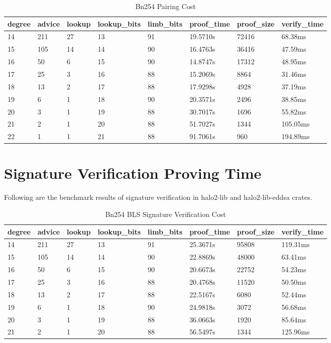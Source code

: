 \documentclass{article}
\begin{document}
\begin{table}[H]
    \centering
    \begin{tabular}{p{1cm}|p{1cm}|p{1cm}|p{2cm}|p{1.5cm}|p{1.5cm}|p{1.5cm}|p{1.5cm}} \hline
          degree&advice&lookup&lookup\_bits&limb\_bits&proof\_time&proof\_size&verify\_time \\ \hline
14&211&27&13&91&19.5710s&72416&68.38ms \\ \hline
15&105&14&14&90&16.4763s&36416&47.59ms\\ \hline
16&50&6&15&90&14.8747s&17312&48.95ms\\ \hline
17&25&3&16&88&15.2069s&8864&31.46ms\\ \hline
18&13&2&17&88&17.9298s&4928&37.19ms\\ \hline
19&6&1&18&90&20.3571s&2496&38.85ms\\ \hline
20&3&1&19&88&30.7017s&1696&55.82ms\\ \hline
21&2&1&20&88&51.7027s&1344&105.05ms\\ \hline
22&1&1&21&88&91.7061s&960&194.89ms\\ \hline
         
    \end{tabular}
    \caption{Bn254 Pairing Cost}
    \label{tab:my_label}
\end{table}


\section{Signature Verification Proving Time}

Following are the benchmark results of signature verification in halo2-lib and halo2-lib-eddsa crates.


\begin{table}[H]
    \centering
    \begin{tabular}{p{1cm}|p{1cm}|p{1cm}|p{2cm}|p{1.5cm}|p{1.5cm}|p{1.5cm}|p{1.5cm}} \hline
          degree&advice&lookup&lookup\_bits&limb\_bits&proof\_time&proof\_size&verify\_time \\ \hline
14&211&27&13&91&25.3671s&95808&119.31ms \\ \hline
15&105&14&14&90&22.8869s&48000&63.41ms\\ \hline
16&50&6&15&90&20.6673s&22752&54.23ms\\ \hline
17&25&3&16&88&20.4768s&11520&50.50ms\\ \hline
18&13&2&17&88&22.5167s&6080&52.44ms\\ \hline
19&6&1&18&90&24.9818s&3072&56.68ms\\ \hline
20&3&1&19&88&36.0663s&1920&85.64ms\\ \hline
21&2&1&20&88&56.5497s&1344&125.96ms\\ \hline
    \end{tabular}
    \caption{Bn254 BLS Signature Verification Cost}
    \label{tab:my_label}
\end{table}
\end{document}
